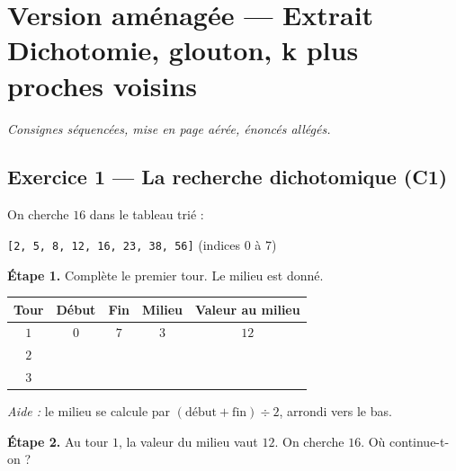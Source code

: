 \section*{Version aménagée --- Extrait Dichotomie, glouton, k plus proches voisins}
\textit{Consignes séquencées, mise en page aérée, énoncés allégés.}

\bigskip

\subsection*{Exercice 1 --- La recherche dichotomique (C1)}

On cherche $16$ dans le tableau trié :

\medskip
\texttt{[2, 5, 8, 12, 16, 23, 38, 56]} \qquad (indices $0$ à $7$)

\bigskip

\textbf{Étape 1.} Complète le premier tour. Le milieu est donné.

\bigskip

\begin{center}
\begin{tabular}{|c|c|c|c|c|}
\hline
\textbf{Tour} & \textbf{Début} & \textbf{Fin} & \textbf{Milieu} & \textbf{Valeur au milieu} \\
\hline
$1$ & $0$ & $7$ & $3$ & $12$ \\
\hline
$2$ & \dotfill & \dotfill & \dotfill & \dotfill \\
\hline
$3$ & \dotfill & \dotfill & \dotfill & \dotfill \\
\hline
\end{tabular}
\end{center}

\medskip
\textit{Aide :} le milieu se calcule par $(\text{début} + \text{fin}) \div 2$,
arrondi vers le bas.

\bigskip

\textbf{Étape 2.} Au tour $1$, la valeur du milieu vaut $12$. On cherche $16$.
Où continue-t-on ?

\medskip
\begin{center}
 \qquad {}
\end{center}


